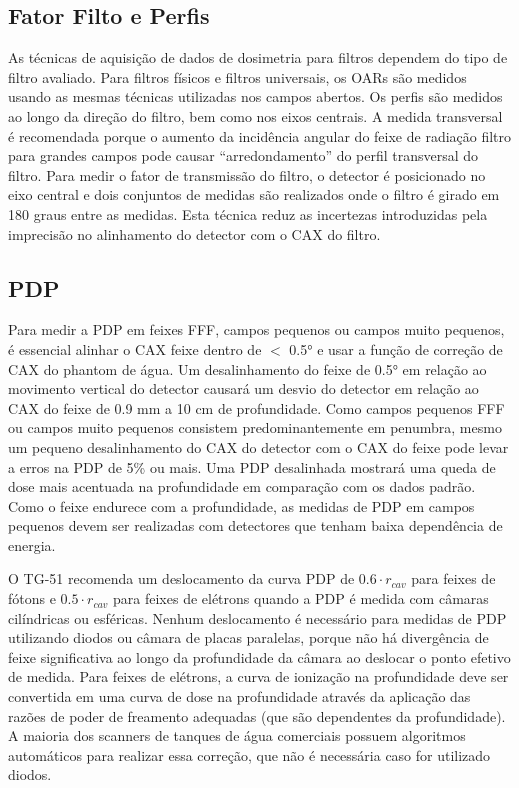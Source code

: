 \documentclass[11pt,a4paper]{article}
\begin{document}
\subsection*{Fator Filto e Perfis}

	As técnicas de aquisição de dados de dosimetria para filtros dependem do tipo de filtro avaliado. Para filtros físicos e filtros universais, os OARs são medidos usando as mesmas técnicas utilizadas nos campos abertos. Os perfis são medidos ao longo da direção do filtro, bem como nos eixos centrais. A medida transversal é recomendada porque o aumento da incidência angular do feixe de radiação filtro para grandes campos pode causar “arredondamento” do perfil transversal do filtro. Para medir o fator de transmissão do filtro, o detector é posicionado no eixo central e dois conjuntos de medidas são realizados onde o filtro é girado em 180 graus entre as medidas. Esta técnica reduz as incertezas introduzidas pela imprecisão no alinhamento do detector com o CAX do filtro.

\subsection*{PDP}

	Para medir a PDP em feixes  FFF, campos pequenos ou campos muito pequenos, é essencial alinhar o CAX feixe dentro de $<$ \ang{0.5} e usar a função de correção de CAX do phantom de água.  Um desalinhamento do feixe de \ang{0.5} em relação ao movimento vertical do detector causará um desvio do detector em relação ao CAX do feixe de 0.9 mm a 10 cm de profundidade. Como campos pequenos FFF ou campos muito pequenos consistem predominantemente em penumbra, mesmo um pequeno desalinhamento do CAX do detector com o CAX do feixe pode levar a erros na PDP de 5\% ou mais. Uma PDP desalinhada mostrará uma queda de dose mais acentuada na profundidade em comparação com os dados padrão. Como o feixe endurece com a profundidade, as medidas de PDP em campos pequenos devem ser realizadas com detectores que tenham baixa dependência de energia.

	O TG-51 recomenda um deslocamento da curva PDP de $0.6 \cdot r_{cav}$ para feixes de fótons e $0.5 \cdot r_{cav}$ para feixes de elétrons quando a PDP é medida com câmaras cilíndricas ou esféricas. Nenhum deslocamento é necessário para medidas de PDP utilizando diodos ou câmara de placas paralelas, porque não há divergência de feixe significativa ao longo da profundidade da câmara ao deslocar o ponto efetivo de medida. Para feixes de elétrons, a curva de ionização na profundidade deve ser convertida em uma curva de dose na profundidade através da aplicação das razões de poder de freamento adequadas (que são dependentes da profundidade). A maioria dos scanners de tanques de água comerciais possuem algoritmos automáticos para realizar essa correção, que não é necessária caso for utilizado diodos.
\end{document}
